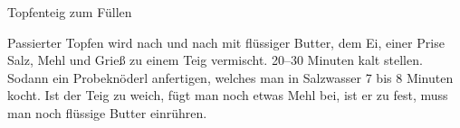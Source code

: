 \begin{recipe}[\vegetarian]{Topfenteig zum Füllen}%

    \begin{ingredients}
    \end{ingredients}

    \begin{instructions}
        Passierter Topfen wird nach und nach mit flüssiger Butter, dem Ei, einer Prise Salz, Mehl und Grieß zu einem Teig vermischt.
        20--30 Minuten kalt stellen.
        Sodann ein Probeknöderl anfertigen, welches man in Salzwasser 7 bis 8 Minuten kocht.
        Ist der Teig zu weich, fügt man noch etwas Mehl bei, ist er zu fest, muss man noch flüssige Butter einrühren.
    \end{instructions}
\end{recipe}
